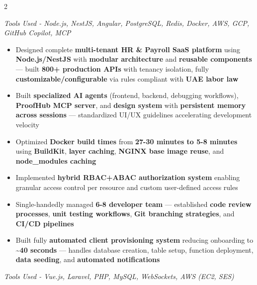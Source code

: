 \documentclass[10pt,a4paper,ragged2e,withhyper]{altacv}
\begin{document}
\begin{paracol}{2}



\small{\textit{Tools Used - Node.js, NestJS, Angular, PostgreSQL, Redis, Docker, AWS, GCP, GitHub Copilot, MCP}}

\begin{itemize}
\item Designed complete \textbf{multi-tenant HR \& Payroll SaaS platform} using \textbf{Node.js/NestJS} with \textbf{modular architecture} and \textbf{reusable components} — built \textbf{800+ production APIs} with tenancy isolation, fully \textbf{customizable/configurable} via rules compliant with \textbf{UAE labor law}
\item Built \textbf{specialized AI agents} (frontend, backend, debugging workflows), \textbf{ProofHub MCP server}, and \textbf{design system} with \textbf{persistent memory across sessions} — standardized UI/UX guidelines accelerating development velocity
\item Optimized \textbf{Docker build times} from \textbf{27-30 minutes to 5-8 minutes} using \textbf{BuildKit}, \textbf{layer caching}, \textbf{NGINX base image reuse}, and \textbf{node\_modules caching}
\item Implemented \textbf{hybrid RBAC+ABAC authorization system} enabling granular access control per resource and custom user-defined access rules
\item Single-handedly managed \textbf{6-8 developer team} — established \textbf{code review processes}, \textbf{unit testing workflows}, \textbf{Git branching strategies}, and \textbf{CI/CD pipelines}
\item Built fully \textbf{automated client provisioning system} reducing onboarding to \textbf{\textasciitilde40 seconds} — handles database creation, table setup, function deployment, \textbf{data seeding}, and \textbf{automated notifications}
\end{itemize}

\divider


\small{\textit{Tools Used - Vue.js, Laravel, PHP, MySQL, WebSockets, AWS (EC2, SES)}}


\end{paracol}
\end{document}
